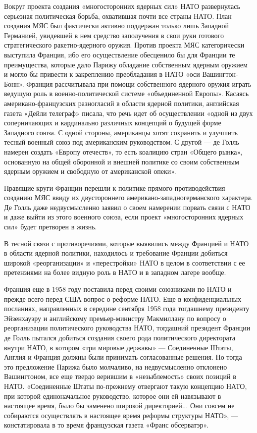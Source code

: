 \documentclass[12pt, a4paper, openany]{book}
\begin{document}
		Вокруг проекта создания «многосторонних ядерных сил» НАТО развернулась серьезная политическая борьба, охватившая почти все страны НАТО. План создания МЯС был фактически активно поддержан только лишь Западной Германией, увидевшей в нем средство заполучения в свои руки готового стратегического ракетно-ядерного оружия. Против проекта МЯС категорически выступила Франция, ибо его осуществление обесценило бы для Франции те преимущества, которые дало Парижу обладание собственным ядерным оружием и могло бы привести к закреплению преобладания в НАТО «оси Вашингтон-Бонн». Франция рассчитывала при помощи собственного ядерного оружия играть ведущую роль в военно-политической системе «объединенной Европы». Касаясь американо-французских разногласий в области ядерной политики, английская газета «Дейли телеграф» писала, что речь идет об осуществлении «одной из двух соперничающих и кардинально различных концепций о будущей форме Западного союза. С одной стороны, американцы хотят сохранить и улучшить тесный военный союз под американским руководством. С другой — де Голль намерен создать «Европу отечеств», то есть коалицию стран «Общего рынка», основанную на общей оборонной и внешней политике со своим собственным ядерным оружием и свободную от американской опеки».
		
		Правящие круги Франции перешли к политике прямого противодействия созданию МЯС ввиду их двустороннего американо-западногерманского характера. Де Голль даже недвусмысленно заявил о своем намерении порвать связи с НАТО и даже выйти из этого военного союза, если проект «многосторонних ядерных сил» будет претворен в жизнь.
		
		В тесной связи с противоречиями, которые выявились между Францией и НАТО в области ядерной политики, находилось и требование Франции добиться широкой «реорганизации» и «перестройки» НАТО в целом в соответствии с ее претензиями на более видную роль в НАТО и в западном лагере вообще.
		
		Франция еще в 1958 году поставила перед своими союзниками по НАТО и прежде всего перед США вопрос о реформе НАТО. Еще в конфиденциальных посланиях, направленных в середине сентября 1958 года тогдашнему президенту Эйзенхауэру и английскому премьер-министру Макмиллану по вопросу о реорганизации политического руководства НАТО, тогдашний президент Франции де Голль пытался добиться создания своего рода политического директората внутри НАТО, в котором «три мировые державы» — Соединенные Штаты, Англия и Франция должны были принимать согласованные решения. Но тогда это предложение Парижа было молчаливо, на недвусмысленно отклонено Вашингтоном, все еще твердо верившим в «незыблемость» своих позиций в НАТО. «Соединенные Штаты по-прежнему отвергают такую концепцию НАТО, при которой единоначальное руководство, которое они ей навязывают в настоящее время, было бы заменено широкой директорией... Они совсем не собираются осуществлять в настоящее время реформы структуры НАТО», — констатировала в то время французская газета «Франс обсерватэр».
		
\end{document}
